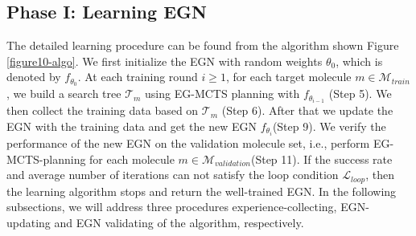 \documentclass[sn-mathphys,Numbered]{sn-jnl}
\begin{document}
\subsection{Phase I: Learning EGN}
The detailed learning procedure can be found from the algorithm shown Figure \ref{figure10-algo}. We first initialize the EGN with random weights $\theta_0$, which is denoted by $f_{\theta_{0}}$. At each training round $i\geq1$, for each target molecule $m\in \mathcal{M}_{train}$, we build a search tree $\mathcal{T}_m$ using EG-MCTS planning with $f_{\theta_{i-1}}$ (Step 5). We then collect the training data based on $\mathcal{T}_m$ (Step 6). After that we update the EGN with the training data and get the new EGN $f_{\theta_{i}}$(Step 9). We verify the performance of the new EGN on the validation molecule set, i.e., perform EG-MCTS-planning for each molecule $m\in \mathcal{M}_{validation}$(Step 11). If the success rate and average number of iterations can not satisfy the loop condition $\mathcal{L}_{loop}$, then the learning algorithm stops and return the well-trained EGN.
In the following subsections, we will address three procedures experience-collecting, EGN-updating and EGN validating of the algorithm, respectively.
\end{document}
